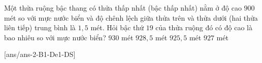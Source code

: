 \begin{ex}%
	Một thửa ruộng bậc thang có thửa thấp nhất (bậc thấp nhất) nằm ở độ cao $900$ mét so với mực nước biển và độ chênh lệch giữa thửa trên và thửa dưới (hai thửa liên tiếp) trung bình là $1{,}5$ mét. Hỏi bậc thứ $19$ của thửa ruộng đó có độ cao là bao nhiêu so với mực nước biển?
	\choice
	{$930$ mét}
	{$928{,}5$ mét}
	{$925{,}5$ mét}
	{\True $927$ mét}
\end{ex}
[ans/ans-2-B1-De1-DS]
\cauds
